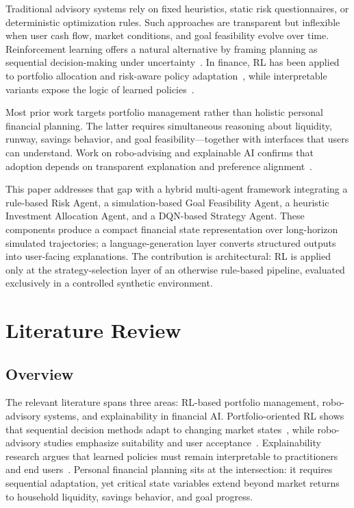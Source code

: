 \documentclass{svproc}
\begin{document}
Traditional advisory systems rely on fixed heuristics, static risk questionnaires, or deterministic optimization rules. Such approaches are transparent but inflexible when user cash flow, market conditions, and goal feasibility evolve over time. Reinforcement learning offers a natural alternative by framing planning as sequential decision-making under uncertainty~\cite{betancourt2021drl,yang2023drl,cheng2024multiagent,li2024multiagent}. In finance, RL has been applied to portfolio allocation and risk-aware policy adaptation~\cite{lee2020maps,betancourt2021drl,yang2023drl,ma2023multiagent,cheng2024multiagent,li2024multiagent}, while interpretable variants expose the logic of learned  policies~\cite{cong2021alpha,guan2021explainable}.

Most prior work targets portfolio management rather than holistic personal financial planning. The latter requires simultaneous reasoning about liquidity, runway, savings behavior, and goal feasibility—together with interfaces that users can understand. Work on robo-advising and explainable AI confirms that adoption depends on transparent explanation and preference alignment~\cite{alsabah2021robo,bendavid2021xai,bianchi2021robo,litty2024xai}.

This paper addresses that gap with a hybrid multi-agent framework integrating a rule-based Risk Agent, a simulation-based Goal Feasibility Agent, a heuristic Investment Allocation Agent, and a DQN-based Strategy Agent. These components produce a compact financial state representation over long-horizon simulated trajectories; a language-generation layer converts structured outputs into user-facing explanations. The contribution is architectural: RL is applied only at the strategy-selection layer of an otherwise rule-based pipeline, evaluated exclusively in a controlled synthetic environment.
%
\section{Literature Review}
%
\subsection{Overview}
The relevant literature spans three areas: RL-based portfolio management, robo-advisory systems, and explainability in financial AI. Portfolio-oriented RL shows that sequential decision methods adapt to changing market states~\cite{lee2020maps,betancourt2021drl,yang2023drl,ma2023multiagent,cheng2024multiagent,li2024multiagent}, while robo-advisory studies emphasize suitability and user acceptance~\cite{alsabah2021robo,bendavid2021xai,bianchi2021robo,litty2024xai,wang2021robo}. Explainability research argues that learned policies must remain interpretable to practitioners and end users~\cite{bendavid2021xai,cong2021alpha,guan2021explainable,bianchi2021robo,litty2024xai}. Personal financial planning sits at the intersection: it requires sequential adaptation, yet critical state variables extend beyond market returns to household liquidity, savings behavior, and goal progress.
\end{document}
